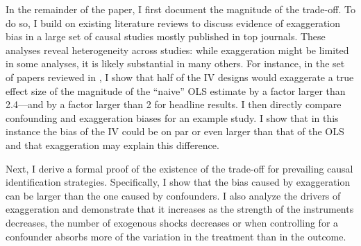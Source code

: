 			In the remainder of the paper, I first document the magnitude of the trade-off. To do so, I build on existing literature reviews \citep{brodeur_methods_2020, young_consistency_2022, bagilet_accurate_2023, lalHow2024} to discuss evidence of exaggeration bias in a large set of causal studies mostly published in top journals. %
			These analyses reveal heterogeneity across studies: while exaggeration might be limited in some analyses, it is likely substantial in many others. 
			For instance, in the set of papers reviewed in \cite{young_consistency_2022}, I show that 
			half of the IV designs would exaggerate a true effect size of the magnitude of the ``naive'' OLS estimate by a factor larger than 2.4---and by a factor larger than 2 for headline results. %
			I then directly compare confounding and exaggeration biases for an example study. I show that in this instance the bias of the IV could be on par or even larger than that of the OLS and that exaggeration may explain this difference. 
			
			Next, I derive a formal proof of the existence of the trade-off for prevailing causal identification strategies. Specifically, I show that the bias caused by exaggeration can be larger than the one caused by confounders. I also analyze the drivers of exaggeration and demonstrate that it increases as the strength of the instruments decreases, the number of exogenous shocks decreases or when controlling for a confounder absorbs more of the variation in the treatment than in the outcome. 
			
